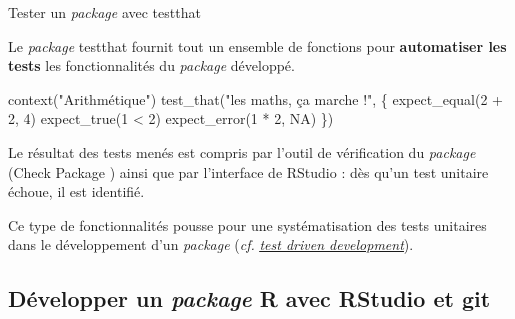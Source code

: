 \documentclass[12pt,handout,ignorenonframetext,]{beamer}
\newenvironment{Shaded}{}{}
\newcommand{\KeywordTok}[1]{\textcolor[rgb]{0.00,0.00,1.00}{#1}}
\newcommand{\DecValTok}[1]{#1}
\newcommand{\StringTok}[1]{\textcolor[rgb]{0.00,0.50,0.50}{#1}}
\newcommand{\OtherTok}[1]{\textcolor[rgb]{1.00,0.25,0.00}{#1}}
\newcommand{\OperatorTok}[1]{#1}
\newcommand{\NormalTok}[1]{#1}
\renewenvironment{Shaded}{\begin{snugshade}}{\end{snugshade}}
\begin{document}
\begin{frame}[fragile]{Tester un \emph{package} avec testthat}

Le \emph{package} testthat fournit tout un ensemble de fonctions pour
\textbf{automatiser les tests} les fonctionnalités du \emph{package}
développé.

\pause \footnotesize

\begin{Shaded}
\begin{Highlighting}[]
\KeywordTok{context}\NormalTok{(}\StringTok{"Arithmétique"}\NormalTok{)}
\KeywordTok{test_that}\NormalTok{(}\StringTok{"les maths, ça marche !"}\NormalTok{, \{}
  \KeywordTok{expect_equal}\NormalTok{(}\DecValTok{2} \OperatorTok{+}\StringTok{ }\DecValTok{2}\NormalTok{, }\DecValTok{4}\NormalTok{)}
  \KeywordTok{expect_true}\NormalTok{(}\DecValTok{1} \OperatorTok{<}\StringTok{ }\DecValTok{2}\NormalTok{)}
  \KeywordTok{expect_error}\NormalTok{(}\DecValTok{1} \OperatorTok{*}\StringTok{ }\DecValTok{2}\NormalTok{, }\OtherTok{NA}\NormalTok{)}
\NormalTok{\})}
\end{Highlighting}
\end{Shaded}

\pause \normalsize \vspace{-0.2cm} Le résultat des tests menés est
compris par l'outil de vérification du \emph{package} (\og Check Package
\fg{}) ainsi que par l'interface de RStudio : dès qu'un test unitaire
échoue, il est identifié.

\pause Ce type de fonctionnalités pousse pour une systématisation des
tests unitaires dans le développement d'un \emph{package} (\emph{cf.}
\href{https://en.wikipedia.org/wiki/Test-driven_development}{\textit{\underline{test driven development}}}).

\end{frame}

\subsection{\texorpdfstring{Développer un \emph{package} R avec RStudio
et
git}{Développer un package R avec RStudio et git}}\label{developper-un-package-r-avec-rstudio-et-git}
\end{document}
